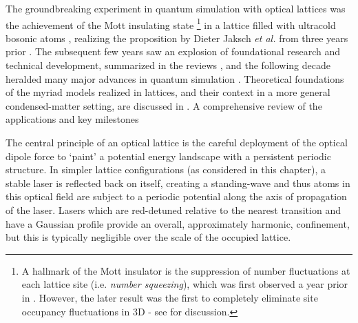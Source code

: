	The groundbreaking experiment in quantum simulation with optical lattices was the achievement of the Mott insulating state \cite{Greiner01}\footnote{A hallmark of the Mott insulator is the suppression of number fluctuations at each lattice site (i.e.
	\emph{number squeezing}), which was first observed a year prior in \cite{Orzel01}.
	However, the later result was the first to completely eliminate site occupancy fluctuations in 3D - see \cite{Morsch06} for discussion.} in a lattice filled with ultracold bosonic atoms \cite{Greiner01}, realizing the proposition by Dieter Jaksch \emph{et al.} from three years prior \cite{Jaksch98}.
	The subsequent few years saw an explosion of foundational research and technical development, summarized in the reviews \cite{Morsch06,Bloch08}, and the following decade heralded many major advances in quantum simulation \cite{Bloch12,Gross17}.
	Theoretical foundations of the myriad models realized in lattices, and their context in a more general condensed-matter setting, are discussed in \cite{LewensteinLattices, Lewenstein07}.
	A comprehensive review of the applications and key milestones 

	The central principle of an optical lattice is the careful deployment of the optical dipole force \cite{Grimm00} to `paint' a potential energy landscape with a persistent periodic structure.
	In simpler lattice configurations (as considered in this chapter), a stable laser is reflected back on itself, creating a standing-wave and thus atoms in this optical field are subject to a periodic potential along the axis of propagation of the laser.
	Lasers which are red-detuned relative to the nearest transition and have a Gaussian profile provide an overall, approximately harmonic, confinement, but this is typically negligible over the scale of the occupied lattice.
	
